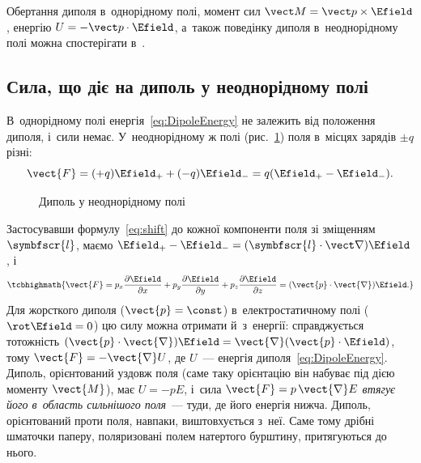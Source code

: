 \begin{Simulation}
Обертання диполя в~однорідному полі, момент сил $\vect M=\vect p\times\Efield$, енергію
$U=-\vect p\cdot\Efield$, а~також поведінку диполя в~неоднорідному полі можна спостерігати
в~.
\end{Simulation}


\subsection*{Сила, що діє на диполь у неоднорідному полі}

В~однорідному полі енергія~\eqref{eq:DipoleEnergy} не залежить від положення диполя, і~сили
немає. У~неоднорідному ж полі (рис.~\ref{tikz:dipole_in_nonuniform_field}) поля в~місцях
зарядів $\pm q$ різні:
\begin{equation*}
	\vect{F} = (+q)\Efield_+ + (-q)\Efield_- = q(\Efield_+ - \Efield_-).
\end{equation*}

\begin{figure}
	\centering
	\caption{Диполь у неоднорідному полі}
	\label{tikz:dipole_in_nonuniform_field}
\end{figure}

Застосувавши формулу~\eqref{eq:shift} до кожної компоненти поля зі зміщенням $\symbfscr{l}$,
маємо $\Efield_+ - \Efield_- = (\symbfscr{l}\cdot\vect\nabla)\Efield$, і
\begin{equation}\label{eq:EforceOnDipole}
	\tcbhighmath{
		\vect{F} = p_x \frac{\partial\Efield}{\partial x} +
		p_y \frac{\partial\Efield}{\partial y} + p_z \frac{\partial\Efield}{\partial z}
		=
		(\vect{p}\cdot\vect{\nabla})\Efield.
	}
\end{equation}
Для жорсткого диполя ($\vect{p} = \const$) в~електростатичному полі ($\rot\Efield = 0$) цю
силу можна отримати й~з~енергії: справджується тотожність $(\vect{p}\cdot\vect{\nabla})\Efield
= \vect{\nabla}(\vect{p}\cdot\Efield)$, тому $\vect{F} = -\vect{\nabla}U$, де $U$~--- енергія
диполя~\eqref{eq:DipoleEnergy}. Диполь, орієнтований уздовж поля (саме таку орієнтацію він
набуває під дією моменту $\vect{M}$), має $U = -pE$, і~сила $\vect{F} = p\,\vect{\nabla}E$
\emph{втягує його в~область сильнішого поля}~--- туди, де його енергія нижча. Диполь,
орієнтований проти поля, навпаки, виштовхується з~неї. Саме тому дрібні шматочки паперу,
поляризовані полем натертого бурштину, притягуються до нього.

